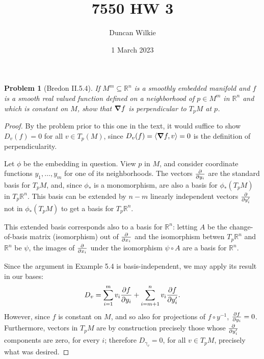 \documentclass{article}
\title{7550 HW 3}
\author{Duncan Wilkie}
\date{1 March 2023}
\newtheorem{plm}{Problem}
\begin{document}
\maketitle

\begin{plm}[Bredon II.5.4]
  If $M^{m} \subseteq \mathbb{R}^{n}$ is a smoothly embedded manifold and $f$ is a smooth real valued function defined
  on a neighborhood of $p \in M^{m}$ in $\mathbb{R}^{n}$ and which is constant on $M$,
  show that $\grad{f}$ is perpendicular to $T_{p}M$ at $p$.
\end{plm}

\begin{proof}
  By the problem prior to this one in the text, it would suffice to show $D_{v}(f) = 0$ for all $v \in T_{p}(M)$,
  since $D_{v}(f) = \langle \grad{f}, v \rangle = 0$ is the definition of perpendicularity.

  Let $\phi$ be the embedding in question.
  View $p$ in $M$, and consider coordinate functions $y_{1}, \ldots, y_{m}$ for one of its neighborhoods.
  The vectors $\pdv{y_{i}}$ are the standard basis for $T_{p}M$, and, since $\phi_{*}$ is a monomorphism,
  are also a basis for $\phi_{*}(T_{p}M)$ in $T_{p}\mathbb{R}^{n}$.
  This basis can be extended by $n - m$ linearly independent vectors $\pdv{y'_{i}}$ not in $\phi_{*}(T_{p}M)$
  to get a basis for $T_{p}\mathbb{R}^{n}$.

  This extended basis corresponds also to a basis for $\mathbb{R}^{n}$:
  letting $A$ be the change-of-basis matrix (isomorphism) out of $\pdv{x_{i}}$ and the isomorphism betwen $T_{p}\mathbb{R}^{n}$
  and $\mathbb{R}^{n}$ be $\psi$, the images of $\pdv{x_{i}}$ under the isomorphism $\psi \circ A$
  are a basis for $\mathbb{R}^{n}$.

  Since the argument in Example 5.4 is basis-independent, we may apply its result in our bases:
  \[
    D_{v} = \sum_{i = 1}^{m}v_{i}\pdv{f}{y_{i}} + \sum_{i = m + 1}^{n}v_{i}\pdv{f}{y'_{i}}.
  \]
  However, since $f$ is constant on $M$, and so also for projections of $f \circ y^{-1}$, $\pdv{f}{y_{i}} = 0$.
  Furthermore, vectors in $T_{p}M$ are by construction precisely those whose $\pdv{y'_{i}}$ components are zero, for every $i$;
  therefore $D_{\gamma_{v}} = 0$, for all $v \in T_{p}M$, precisely what was desired.
\end{proof}
\end{document}
